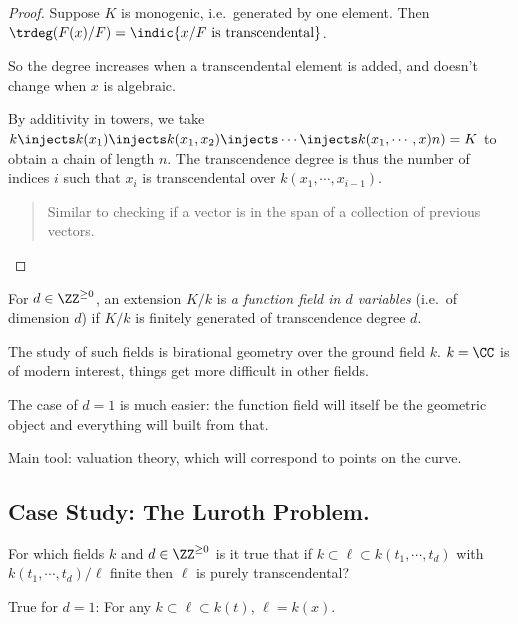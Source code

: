 \begin{proof}

Suppose \(K\) is monogenic, i.e.~generated by one element. Then
\(\trdeg(F(x)/F) = \indic{x/F\text{ is transcendental}}\).

So the degree increases when a transcendental element is added, and
doesn't change when \(x\) is algebraic.

By additivity in towers, we take
\(k \injects k(x_1) \injects k(x_1, x_2) \injects \cdots \injects k(x_1, \cdots, x)n) = K\)
to obtain a chain of length \(n\). The transcendence degree is thus the
number of indices \(i\) such that \(x_i\) is transcendental over
\(k(x_1, \cdots, x_{i-1})\).

\begin{quote}
Similar to checking if a vector is in the span of a collection of
previous vectors.
\end{quote}

\end{proof}

\begin{definition}

For \(d\in\ZZ^{\geq 0}\), an extension \(K/k\) is \emph{a function field
in \(d\) variables} (i.e.~of dimension \(d\)) if \(K/k\) is finitely
generated of transcendence degree \(d\).

\end{definition}

The study of such fields is birational geometry over the ground field
\(k\). \(k=\CC\) is of modern interest, things get more difficult in
other fields.

The case of \(d=1\) is much easier: the function field will itself be
the geometric object and everything will built from that.

Main tool: valuation theory, which will correspond to points on the
curve.

\hypertarget{case-study-the-luroth-problem.}{%
\subsection{Case Study: The Luroth
Problem.}\label{case-study-the-luroth-problem.}}

For which fields \(k\) and \(d\in \ZZ^{\geq 0}\) is it true that if
\(k \subset \ell \subset k(t_1, \cdots, t_d)\) with
\(k(t_1 ,\cdots, t_d)/\ell\) finite then \(\ell\) is purely
transcendental?

\begin{theorem}[Luroth]

True for \(d=1\): For any \(k\subset \ell \subset k(t)\),
\(\ell = k(x)\).

\end{theorem}

